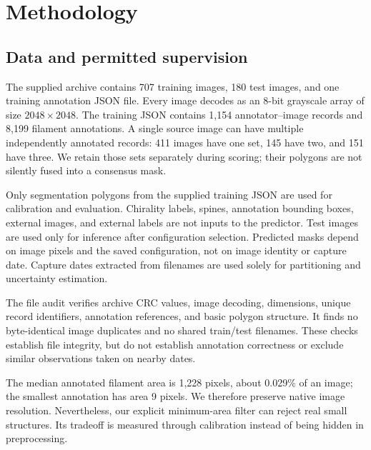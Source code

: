 \documentclass[sigconf]{acmart}
\begin{document}
\section{Methodology}\label{sec:methodology}
\subsection{Data and permitted supervision}
The supplied archive contains 707 training images, 180 test images, and one training annotation JSON file. Every image decodes as an 8-bit grayscale array of size $2048\times2048$. The training JSON contains 1,154 annotator--image records and 8,199 filament annotations. A single source image can have multiple independently annotated records: 411 images have one set, 145 have two, and 151 have three. We retain those sets separately during scoring; their polygons are not silently fused into a consensus mask.

Only segmentation polygons from the supplied training JSON are used for calibration and evaluation. Chirality labels, spines, annotation bounding boxes, external images, and external labels are not inputs to the predictor. Test images are used only for inference after configuration selection. Predicted masks depend on image pixels and the saved configuration, not on image identity or capture date. Capture dates extracted from filenames are used solely for partitioning and uncertainty estimation.

The file audit verifies archive CRC values, image decoding, dimensions, unique record identifiers, annotation references, and basic polygon structure. It finds no byte-identical image duplicates and no shared train/test filenames. These checks establish file integrity, but do not establish annotation correctness or exclude similar observations taken on nearby dates.

The median annotated filament area is 1,228 pixels, about 0.029\% of an image; the smallest annotation has area 9 pixels. We therefore preserve native image resolution. Nevertheless, our explicit minimum-area filter can reject real small structures. Its tradeoff is measured through calibration instead of being hidden in preprocessing.
\end{document}
